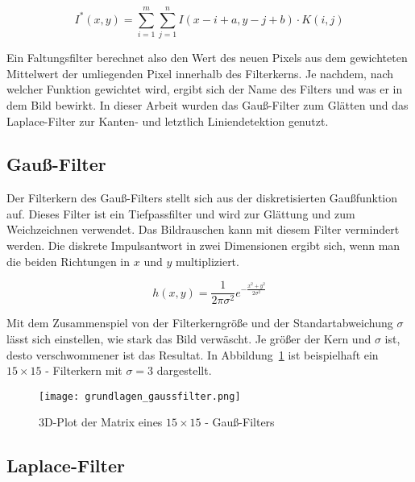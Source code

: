\begin{equation}
I^{\ast}(x,y) = \sum_{i=1}^{m} \sum_{j=1}^{n} I(x-i+a, y-j+b) \cdot K(i,j)
\end{equation}

Ein Faltungsfilter berechnet also den Wert des neuen Pixels aus dem gewichteten Mittelwert der umliegenden Pixel innerhalb des Filterkerns. Je nachdem, nach welcher Funktion gewichtet wird, ergibt sich der Name des Filters und was er in dem Bild bewirkt. In dieser Arbeit wurden das Gauß-Filter zum Glätten und das Laplace-Filter zur Kanten- und letztlich Liniendetektion genutzt.

\subsection{Gauß-Filter}

Der Filterkern des Gauß-Filters stellt sich aus der diskretisierten Gaußfunktion auf. Dieses Filter ist ein Tiefpassfilter und wird zur Glättung und zum Weichzeichnen verwendet. Das Bildrauschen kann mit diesem Filter vermindert werden. Die diskrete Impulsantwort in zwei Dimensionen ergibt sich, wenn man die beiden Richtungen in \( x\) und \( y \) multipliziert.

\begin{equation}
h(x,y) = \frac{1}{2\pi\sigma^2} e^{-\frac{x^2+y^2}{2\sigma^2}}
\end{equation}

Mit dem Zusammenspiel von der Filterkerngröße und der Standartabweichung \( \sigma \) lässt sich einstellen, wie stark das Bild verwäscht. Je größer der Kern und \( \sigma \) ist, desto verschwommener ist das Resultat. In Abbildung~\ref{fig:grundlagen_gaussfilter} ist beispielhaft ein \( 15\times15\) - Filterkern mit \( \sigma = 3\) dargestellt.

\begin{figure}[H] %
  \centering
  \texttt{[image: grundlagen\_gaussfilter.png]}
  \caption{3D-Plot der Matrix eines \( 15\times15\) - Gauß-Filters}
  \label{fig:grundlagen_gaussfilter}
\end{figure}  

\subsection{Laplace-Filter}


